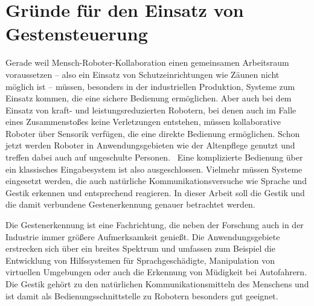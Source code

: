 \section{Gründe für den Einsatz von Gestensteuerung}
Gerade weil Mensch-Roboter-Kollaboration einen gemeinsamen Arbeitsraum voraussetzen -- also ein Einsatz von Schutzeinrichtungen wie Zäunen nicht möglich ist -- müssen, besonders in der industriellen Produktion, Systeme zum Einsatz kommen, die eine sichere Bedienung ermöglichen. Aber auch bei dem Einsatz von kraft- und leistungsreduzierten Robotern, bei denen auch im Falle eines Zusammenstoßes keine Verletzungen entstehen, müssen kollaborative Roboter über Sensorik verfügen, die eine direkte Bedienung ermöglichen. Schon jetzt werden Roboter in Anwendungsgebieten wie der Altenpflege genutzt und treffen dabei auch auf ungeschulte Personen.~\cite{fraunhoferMRK} Eine komplizierte Bedienung über ein klassisches Eingabesystem ist also ausgeschlossen. Vielmehr müssen Systeme eingesetzt werden, die auch natürliche Kommunikationsversuche wie Sprache und Gestik erkennen und entsprechend reagieren. In dieser Arbeit soll die Gestik und die damit verbundene Gestenerkennung genauer betrachtet werden.

Die Gestenerkennung ist eine Fachrichtung, die neben der Forschung auch in der Industrie immer größere Aufmerksamkeit genießt. Die Anwendungsgebiete erstrecken sich über ein breites Spektrum und umfassen zum Beispiel die Entwicklung von Hilfssystemen für Sprachgeschädigte,  Manipulation von virtuellen Umgebungen oder auch die Erkennung von Müdigkeit bei Autofahrern. Die Gestik gehört zu den natürlichen Kommunikationsmitteln des Menschens und ist damit als Bedienungsschnittstelle zu Robotern besonders gut geeignet.
